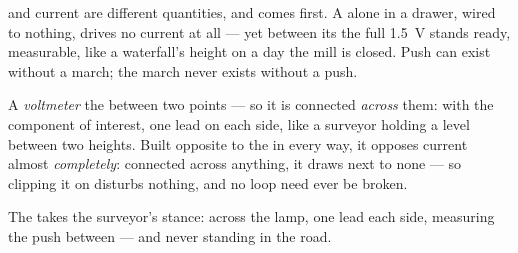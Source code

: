 \begin{proposition}\label{prop:g8:voltage-voltmeter:nocurrent}
 and current are different quantities, and  comes
first. A  alone in a drawer, wired to nothing, drives no
current at all --- yet between its  the full
\qty{1.5}{V} stands ready, measurable, like a waterfall's
height on a day the mill is closed. Push can exist without a
march; the march never exists without a push.
\end{proposition}

\begin{definition}[Voltmeter]\label{def:g8:voltage-voltmeter:voltmeter}
A \emph{voltmeter}  the 
between two points --- so it is connected \emph{across} them:
\emph{} with the component of interest, one lead on
each side, like a surveyor holding a level between two heights.
Built opposite to the  in every way, it opposes current
almost \emph{completely}: connected across anything, it draws
next to none --- so clipping it on disturbs nothing, and no
loop need ever be broken.
\end{definition}

\begin{omfigure}

{\small The  takes the surveyor's stance: across the
lamp, one lead each side, measuring the push between --- and
never standing in the road.}
\end{omfigure}

